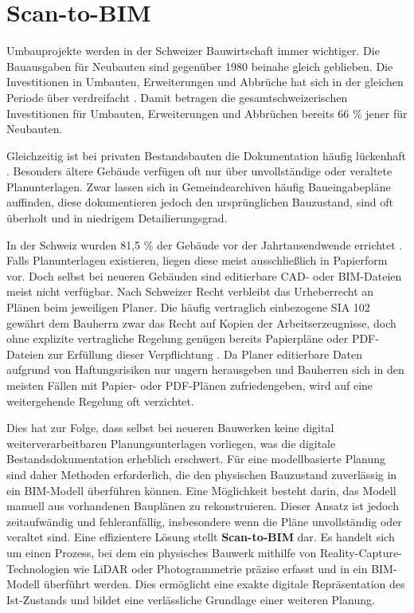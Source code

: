 \section{Scan-to-BIM}
\begin{German}
    Umbauprojekte werden in der Schweizer Bauwirtschaft immer wichtiger. Die Bauausgaben für Neubauten sind gegenüber 1980 beinahe gleich geblieben. Die Investitionen in Umbauten, Erweiterungen und Abbrüche hat sich in der gleichen Periode über verdreifacht \cite{bundesamtfuerstatstikBauausgabenNachArt}. Damit betragen die gesamtschweizerischen Investitionen für Umbauten, Erweiterungen und Abbrüchen bereits 66 \% jener für Neubauten. 

    Gleichzeitig ist bei privaten Bestandsbauten die Dokumentation häufig lückenhaft \cite{dewolfCircularBuiltEnvironmentg, kadenLeitfadenGeodaesieUnd}. Besonders ältere Gebäude verfügen oft nur über unvollständige oder veraltete Planunterlagen. Zwar lassen sich in Gemeindearchiven häufig Baueingabepläne auffinden, diese dokumentieren jedoch den ursprünglichen Bauzustand, sind oft überholt und in niedrigem Detailierungsgrad.
    
    In der Schweiz wurden 81,5 \% der Gebäude vor der Jahrtausendwende errichtet \cite{bundesamtfuerstatstikBauperiode}. Falls Planunterlagen existieren, liegen diese meist ausschließlich in Papierform vor. Doch selbst bei neueren Gebäuden sind editierbare CAD- oder BIM-Dateien meist nicht verfügbar. Nach Schweizer Recht verbleibt das Urheberrecht an Plänen beim jeweiligen Planer. Die häufig vertraglich einbezogene SIA 102 gewährt dem Bauherrn zwar das Recht auf Kopien der Arbeitserzeugnisse, doch ohne explizite vertragliche Regelung genügen bereits Papierpläne oder PDF-Dateien zur Erfüllung dieser Verpflichtung \cite{bundschwBauenRechtenUnd}. Da Planer editierbare Daten aufgrund von Haftungsrisiken nur ungern herausgeben und Bauherren sich in den meisten Fällen mit Papier- oder PDF-Plänen zufriedengeben, wird auf eine weitergehende Regelung oft verzichtet. 
    
    Dies hat zur Folge, dass selbst bei neueren Bauwerken keine digital weiterverarbeitbaren Planungsunterlagen vorliegen, was die digitale Bestandsdokumentation erheblich erschwert. Für eine modellbasierte Planung sind daher Methoden erforderlich, die den physischen Bauzustand zuverlässig in ein BIM-Modell überführen können. Eine Möglichkeit besteht darin, das Modell manuell aus vorhandenen Bauplänen zu rekonstruieren. Dieser Ansatz ist jedoch zeitaufwändig und fehleranfällig, insbesondere wenn die Pläne unvollständig oder veraltet sind. Eine effizientere Lösung stellt \textbf{Scan-to-BIM} dar. Es handelt sich um einen Prozess, bei dem ein physisches Bauwerk mithilfe von Reality-Capture-Technologien wie LiDAR oder Photogrammetrie präzise erfasst und in ein BIM-Modell überführt werden. Dies ermöglicht eine exakte digitale Repräsentation des Ist-Zustands und bildet eine verlässliche Grundlage einer weiteren Planung.


\end{German}
